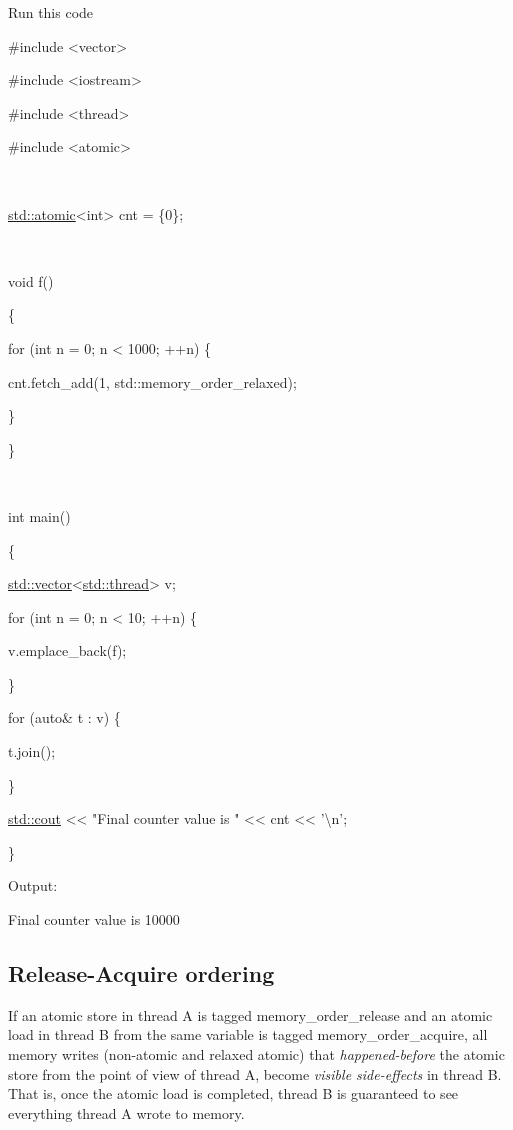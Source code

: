\documentclass[
]{article}
\begin{document}
Run this code

\#include \textless vector\textgreater{}

\#include \textless iostream\textgreater{}

\#include \textless thread\textgreater{}

\#include \textless atomic\textgreater{}

~

\href{http://en.cppreference.com/w/cpp/atomic/atomic}{std::atomic}\textless int\textgreater{}
cnt = \{0\};

~

void f()

\{

for (int n = 0; n \textless{} 1000; ++n) \{

cnt.fetch\_add(1, std::memory\_order\_relaxed);

\}

\}

~

int main()

\{

\href{http://en.cppreference.com/w/cpp/container/vector}{std::vector}\textless{}\href{http://en.cppreference.com/w/cpp/thread/thread}{std::thread}\textgreater{}
v;

for (int n = 0; n \textless{} 10; ++n) \{

v.emplace\_back(f);

\}

for (auto\& t : v) \{

t.join();

\}

\href{http://en.cppreference.com/w/cpp/io/cout}{std::cout}
\textless\textless{} "Final counter value is " \textless\textless{} cnt
\textless\textless{} '\textbackslash n';

\}

Output:

Final counter value is 10000

\hypertarget{release-acquire-ordering}{%
\subsection{Release-Acquire ordering}\label{release-acquire-ordering}}

If an atomic store in thread A is tagged memory\_order\_release and an
atomic load in thread B from the same variable is tagged
memory\_order\_acquire, all memory writes (non-atomic and relaxed
atomic) that \emph{happened-before} the atomic store from the point of
view of thread A, become \emph{visible side-effects} in thread B. That
is, once the atomic load is completed, thread B is guaranteed to see
everything thread A wrote to memory.
\end{document}
